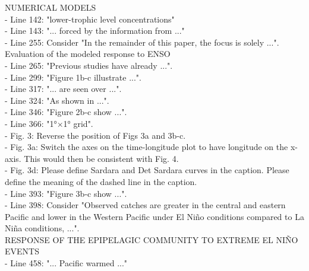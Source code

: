 \documentclass[12pt]{article}
\begin{document}

NUMERICAL MODELS\\

- Line 142: "lower-trophic level concentrations"\\

- Line 143: "... forced by the information from ..."\\

- Line 255: Consider "In the remainder of this paper, the focus is solely ...".\\

Evaluation of the modeled response to ENSO\\
- Line 265: "Previous studies have already ...".\\

- Line 299: "Figure 1b-c illustrate ...".\\

- Line 317: "... are seen over ...".\\

- Line 324: "As shown in ...".\\

- Line 346: "Figure 2b-c show ...".\\

- Line 366: "1°×1° grid".\\

- Fig. 3: Reverse the position of Figs 3a and 3b-c.\\

- Fig. 3a: Switch the axes on the time-longitude plot to have longitude on the x-axis. This would then be consistent with Fig. 4.\\

- Fig. 3d: Please define Sardara and Det Sardara curves in the caption. Please define the meaning of the dashed line in the caption.\\

- Line 393: "Figure 3b-c show ...".\\

- Line 398: Consider "Observed catches are greater in the central and eastern Pacific and lower in the Western Pacific under El Niño conditions compared to La Niña conditions, ...".\\

RESPONSE OF THE EPIPELAGIC COMMUNITY TO EXTREME EL NIÑO EVENTS\\

- Line 458: "... Pacific warmed ..."\\
\end{document}
